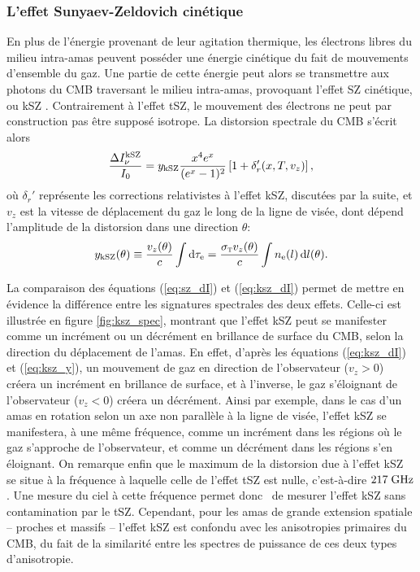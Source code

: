 \subsubsection{L'effet Sunyaev-Zeldovich cinétique} %
En plus de l'énergie provenant de leur agitation thermique, les électrons libres du milieu intra-amas peuvent posséder une énergie cinétique du fait de mouvements d'ensemble du gaz.
Une partie de cette énergie peut alors se transmettre aux photons du CMB traversant le milieu intra-amas, provoquant l'effet SZ cinétique, ou kSZ \cite{sunyaev_velocity_1980}.
Contrairement à l'effet tSZ, le mouvement des électrons ne peut par construction pas être supposé isotrope.
La distorsion spectrale du CMB s'écrit alors
\begin{equation}
    \label{eq:ksz_dI}
    \frac{\Delta I_\nu^{\rm kSZ}}{I_0} = y_{\rm kSZ} \frac{x^4 e^x}{(e^x - 1)^2}\left[ 1 + \delta_r'(x, T, v_z) \right],
\end{equation}
où $\delta_r'$ représente les corrections relativistes à l'effet kSZ, discutées par la suite, et $v_z$ est la vitesse de déplacement du gaz le long de la ligne de visée, dont dépend l'amplitude de la distorsion dans une direction $\theta$:
\begin{equation}
    \label{eq:ksz_y}
    y_{\rm kSZ}(\theta) \equiv \frac{v_z(\theta)}{c} \int \mathrm{d}\tau_{\rm e}
    = \frac{\sigma_\textsc{t} v_z(\theta)}{c} \int n_{\rm e}(l) \,\mathrm{d} l(\theta).
\end{equation}

La comparaison des équations (\ref{eq:sz_dI}) et (\ref{eq:ksz_dI}) permet de mettre en évidence la différence entre les signatures spectrales des deux effets.
Celle-ci est illustrée en figure \ref{fig:ksz_spec}, montrant que l'effet kSZ peut se manifester comme un incrément ou un décrément en brillance de surface du CMB, selon la direction du déplacement de l'amas.
En effet, d'après les équations (\ref{eq:ksz_dI}) et (\ref{eq:ksz_y}), un mouvement de gaz en direction de l'observateur ($v_z > 0$) créera un incrément en brillance de surface, et à l'inverse, le gaz s'éloignant de l'observateur ($v_z < 0$) créera un décrément.
Ainsi par exemple, dans le cas d'un amas en rotation selon un axe non parallèle à la ligne de visée, l'effet kSZ se manifestera, à une même fréquence, comme un incrément dans les régions où le gaz s'approche de l'observateur, et comme un décrément dans les régions s'en éloignant.
On remarque enfin que le maximum de la distorsion due à l'effet kSZ se situe à la fréquence à laquelle celle de l'effet tSZ est nulle, c'est-à-dire $217 \;{\rm GHz}$.
Une mesure du ciel à cette fréquence permet donc \prior\ de mesurer l'effet kSZ sans contamination par le tSZ.
Cependant, pour les amas de grande extension spatiale -- proches et massifs -- l'effet kSZ est confondu avec les anisotropies primaires du CMB, du fait de la similarité entre les spectres de puissance de ces deux types d'anisotropie.

